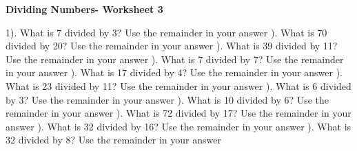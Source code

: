 \documentclass{article}%
\begin{document}
\newline%
\newline%
\newline%
\pagebreak%
\large%
\begin{center}%
\textbf{Dividing Numbers- Worksheet 3}%
\newline%
\end{center} \normalsize%
1). What is 7 divided by 3? Use the remainder in your answer%
\newline%
\newline%
). What is 70 divided by 20? Use the remainder in your answer%
\newline%
\newline%
). What is 39 divided by 11? Use the remainder in your answer%
\newline%
\newline%
). What is 7 divided by 7? Use the remainder in your answer%
\newline%
\newline%
). What is 17 divided by 4? Use the remainder in your answer%
\newline%
\newline%
). What is 23 divided by 11? Use the remainder in your answer%
\newline%
\newline%
). What is 6 divided by 3? Use the remainder in your answer%
\newline%
\newline%
). What is 10 divided by 6? Use the remainder in your answer%
\newline%
\newline%
). What is 72 divided by 17? Use the remainder in your answer%
\newline%
\newline%
). What is 32 divided by 16? Use the remainder in your answer%
\newline%
\newline%
). What is 32 divided by 8? Use the remainder in your answer%
\newline%
\end{document}
